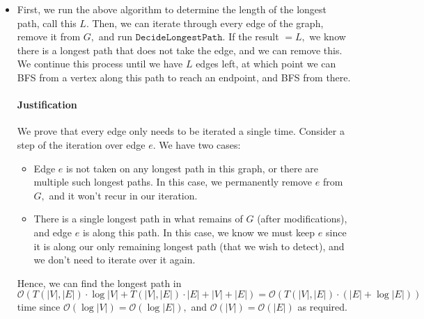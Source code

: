 \documentclass[12pt]{article}
\begin{document}
\begin{enumerate}
\begin{itemize}
        Our initial range on $k$ is $[0, |V| - 1],$ since any path
        with $> n -1$ edges must be incident on $> n$ vertices, and
        we cannot re-visit vertices. Since this requires $O( \log
        |V|)$ iterations of $\texttt{DecideLongestPath},$ this algorithm runs in
        $$
        \mathcal O(T(|V|, |E|) \cdot \log |V|)
        $$
        time.

      \item First, we run the above algorithm to determine the length
        of the longest path, call this $L.$ Then, we can iterate
        through every edge of the graph, remove it from $G,$ and run
        $\texttt{DecideLongestPath}.$ If the result $= L,$ we know
        there is a longest path that does not take the edge, and we
        can remove this. We continue this process until we have $L$
        edges left, at which point we can BFS from a vertex along
        this path to reach an endpoint, and BFS from there.

        \paragraph{Justification} We prove that every edge only needs
        to be iterated a single time. Consider a step of the
        iteration over edge $e.$ We have two cases:
        \begin{itemize}
          \item Edge $e$ is not taken on any longest path in this
            graph, or there are multiple such longest paths. In this
            case, we permanently remove $e$ from $G,$ and it won't
            recur in our iteration.

          \item There is a single longest path in what remains of $G$
            (after modifications), and edge $e$ is along this path.
            In this case, we know we must keep $e$ since it is along
            our only remaining longest path (that we wish to detect),
            and we don't need to iterate over it again.
        \end{itemize}

        Hence, we can find the longest path in
        $$
        \mathcal O(T(|V|, |E|) \cdot \log |V| + T(|V|, |E|) \cdot |E|
        + |V| + |E|) = \mathcal O(T(|V|, |E|) \cdot (|E| + \log |E|))
        $$
        time since $\mathcal O(\log |V|) = \mathcal O(\log |E|),$ and
        $\mathcal O(|V|) = \mathcal O(|E|)$ as required.
    \end{itemize}


\end{enumerate}
\end{document}
